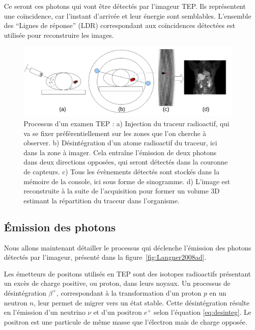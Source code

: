 Ce seront ces photons qui vont être détectés par l'imageur TEP. Ils représentent une coïncidence, car l'instant d'arrivée et leur énergie sont semblables. L'ensemble des ``Lignes de réponse'' (LDR) correspondant aux coïncidences détectées est utilisée pour reconstruire les images.

\begin{figure}
\centering
\includegraphics[width=16cm]{images/schemaTEP}
\caption[Présentation simplifiée de la TEP]{Processus d'un examen TEP : a) Injection du traceur radioactif, qui va se fixer préférentiellement sur les zones que l'on cherche à observer. b) Désintégration d'un atome radioactif du traceur, ici dans la zone à imager. Cela entraîne l'émission de deux photons dans deux directions opposées, qui seront détectés dans la couronne de capteurs. c) Tous les évènements détectés sont stockés dans la mémoire de la console, ici sous forme de sinogramme. d) L'image est reconstruite à la suite de l'acquisition pour former un volume 3D estimant la répartition du traceur dans l'organisme.}
\label{fig:schemaTEP}
\end{figure}

	\subsection{\'Emission des photons}

Nous allons maintenant détailler le processus qui déclenche l'émission des photons détectés par l'imageur, présenté dans la figure~\ref{fig:Langner2008ad}.

Les émetteurs de positons utilisés en TEP sont des isotopes radioactifs présentant un excès de charge positive, ou proton, dans leurs noyaux. Un processus de désintégration $\beta^+$, correspondant à la transformation d’un proton $p$ en un neutron $n$, leur permet de migrer vers un état stable. Cette désintégration résulte en l’émission d’un neutrino $\nu$ et d’un positron $e^+$ selon l’équation \ref{eq:desinteg}. Le positron est une particule de même masse que l’électron mais de charge opposée.

